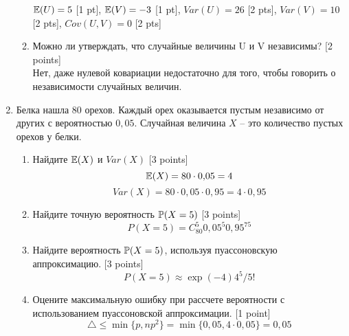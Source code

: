 \documentclass[pdftex,12pt,a4paper]{article}
\begin{document}
\begin{enumerate}
\begin{enumerate}
$\E(U)=5$ [1 pt], $\E(V)=-3$ [1 pt], $Var(U)=26$ [2 pts], $Var(V)=10$ [2 pts], $Cov(U,V)=0$ [2 pts]
\item Можно ли утверждать, что случайные величины U и V независимы? [2 points]\\
Нет, даже нулевой ковариации недостаточно для того, чтобы говорить о независимости случайных величин.
\end{enumerate}



\item Белка нашла 80 орехов. Каждый орех оказывается пустым независимо от других с вероятностью $0{,}05$. Случайная величина $X$ -- это количество пустых орехов у белки.
\begin{enumerate}
\item Найдите $\E(X)$ и $Var(X)$ [3 points]
\begin{equation}
\E(X)=80\cdot 0{,}05=4
\end{equation}
\begin{equation}
Var(X)=80\cdot 0{,}05\cdot 0{,}95=4\cdot 0{,}95
\end{equation}
\item Найдите точную вероятность $\P(X=5)$ [3 points]
\begin{equation}
P(X=5)=C_{80}^{5}0{,}05^{5}0{,}95^{75}
\end{equation}
\item Найдите вероятность $\P(X=5)$, используя пуассоновскую аппроксимацию. [3 points]
\begin{equation}
P(X=5)\approx \exp(-4)4^5/5!
\end{equation}
\item Оцените максимальную ошибку при рассчете вероятности с использованием пуассоновской аппроксимации. [1 point]
\begin{equation}
\triangle\leq \min\{p,np^2\}=\min\{0{,}05,4\cdot 0{,}05\}=0{,}05
\end{equation}
\end{enumerate}





\end{enumerate}
\end{document}
